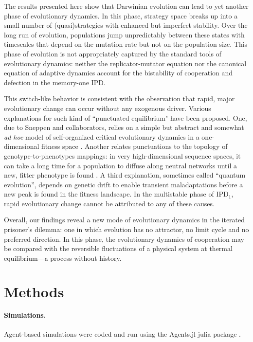 \documentclass[12pt]{article}
\def\IPD{\textrm{IPD}}
\def\IPD1{\textrm{IPD}_1}
\begin{document}
The results presented here show that Darwinian evolution can lead to yet another phase of evolutionary dynamics. In this phase, strategy space breaks up into a small number of (quasi)strategies with enhanced but imperfect stability. Over the long run of evolution, populations jump unpredictably between these states with timescales that depend on the mutation rate but not on the population size. This phase of evolution is not appropriately captured by the standard tools of evolutionary dynamics: neither the replicator-mutator equation nor the canonical equation of adaptive dynamics account for the bistability of cooperation and defection in the memory-one IPD. 

This switch-like behavior is consistent with the observation that rapid, major evolutionary change can occur without any exogenous driver. Various explanations for such kind of ``punctuated equilibrium" have been proposed. One, due to Sneppen and collaborators, relies on a simple but abstract and somewhat \emph{ad hoc} model of self-organized critical evolutionary dynamics in a one-dimensional fitness space \cite{sneppen_evolution_1995}. Another relates punctuations to the topology of genotype-to-phenotypes mappings: in very high-dimensional sequence spaces, it can take a long time for a population to diffuse along neutral networks until a new, fitter phenotype is found \cite{fontana_continuity_1998, crutchfield_evolutionary_2002,bakhtin_evolution_2021}. A third explanation, sometimes called ``quantum evolution'', depends on genetic drift to enable transient maladaptations before a new peak is found in the fitness landscape. In the multistable phase of $\IPD1$, rapid evolutionary change cannot be attributed to any of these causes. 

Overall, our findings reveal a new mode of evolutionary dynamics in the iterated prisoner's dilemma: one in which evolution has no attractor, no limit cycle and no preferred direction. In this phase, the evolutionary dynamics of cooperation may be compared with the reversible fluctuations of a physical system at thermal equilibrium---a process without history. 

\section*{Methods}

\paragraph*{Simulations.}
Agent-based simulations were coded and run using the Agents.jl julia package \cite{datseris_agents_2021}. 

\printbibliography
\end{document}
